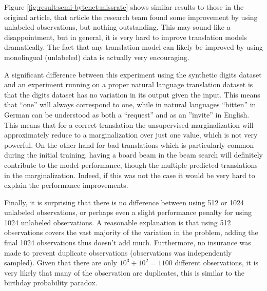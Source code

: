 Figure \ref{fig:result:semi-bytenet:missrate} shows similar results to those in the original article, that article the research team found some improvement by using unlabeled observations, but nothing outstanding. This may sound like a disappointment, but in general, it is very hard to improve translation models dramatically. The fact that any translation model can likely be improved by using monolingual (unlabeled) data is actually very encouraging.

A significant difference between this experiment using the synthetic digits dataset and an experiment running on a proper natural language translation dataset is that the digits dataset has no variation in its output given the input. This means that ``one'' will always correspond to one, while in natural languages ``bitten'' in German can be understood as both a ``request'' and as an ''invite'' in English. This means that for a correct translation the unsupervised marginalization will approximately reduce to a marginalization over just one value, which is not very powerful. On the other hand for bad translations which is particularly common during the initial training, having a board beam in the beam search will definitely contribute to the model performance, though the multiple predicted translations in the marginalization. Indeed, if this was not the case it would be very hard to explain the performance improvements. 

Finally, it is surprising that there is no difference between using 512 or 1024 unlabeled observations, or perhaps even a slight performance penalty for using 1024 unlabeled observations. A reasonable explanation is that using 512 observations covers the vast majority of the variation in the problem, adding the final 1024 observations thus doesn't add much. Furthermore, no insurance was made to prevent duplicate observations (observations was independently sampled). Given that there are only $10^3 + 10^2 = 1100$ different observations, it is very likely that many of the observation are duplicates, this is similar to the birthday probability paradox.
